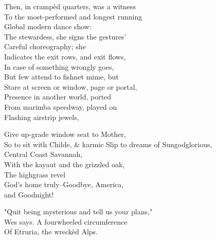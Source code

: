 Then, in crampèd quarters, was a witness \\
To the most-performed and longest running \\
Global modern dance show: \\
The stewardess, she signs the gestures' \\
Careful choreography; she \\
Indicates the exit rows, and exit flows, \\
In case of something wrongly goes, \\
But few attend to fishnet mime, but \\
Stare at screen or window, page or portal, \\
Presence in another world, ported \\
From marimba speedway, played on \\
Flashing airstrip jewels,

Give up-grade window seat to Mother, \\
So to sit with Childe, \& karmic
Slip to dreams of Sungodglorious, \\
Central Coast Savannah, \\
With the kayaut and the grizzled oak, \\
The highgrass revel \\
God's home truly--Goodbye, America, \\
and Goodnight!

"Quit being mysterious and tell us your plans," \\
Wes says. A fourwheeled circumference \\
Of Etruria, the wreckèd Alps.